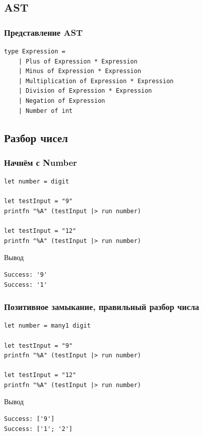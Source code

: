 \documentclass[xetex,mathserif,serif]{beamer}
\begin{document}
    \subsection{AST}

    \begin{frame}[fragile]
        \frametitle{Представление AST}
        \begin{verbatim}
type Expression =
    | Plus of Expression * Expression
    | Minus of Expression * Expression
    | Multiplication of Expression * Expression
    | Division of Expression * Expression
    | Negation of Expression
    | Number of int
        \end{verbatim}
    \end{frame}

    \subsection{Разбор чисел}

    \begin{frame}[fragile]
        \frametitle{Начнём с Number}
        \begin{verbatim}
let number = digit

let testInput = "9"
printfn "%A" (testInput |> run number)

let testInput = "12"
printfn "%A" (testInput |> run number)
        \end{verbatim}

        \begin{exampleblock}{Вывод}
            \begin{verbatim}
Success: '9'
Success: '1'
            \end{verbatim}
        \end{exampleblock}
    \end{frame}

    \begin{frame}[fragile]
        \frametitle{Позитивное замыкание, правильный разбор числа}
        \begin{verbatim}
let number = many1 digit

let testInput = "9"
printfn "%A" (testInput |> run number)

let testInput = "12"
printfn "%A" (testInput |> run number)
        \end{verbatim}

        \begin{exampleblock}{Вывод}
            \begin{verbatim}
Success: ['9']
Success: ['1'; '2']
            \end{verbatim}
        \end{exampleblock}
    \end{frame}
\end{document}

